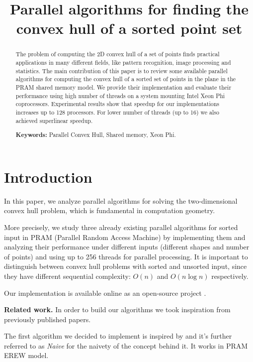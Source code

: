 \documentclass[letterpaper]{article}
\title{Parallel algorithms for finding the convex hull of a sorted point set}
\newcommand{\mypar}[1]{{\bf #1.}}
\theoremstyle{definition}
\begin{document}
%
\maketitle
%

\begin{abstract}
The problem of computing the 2D convex hull of a set of points finds practical applications in many different fields, like pattern recognition, image processing and statistics.
The main contribution of this paper is to review some available parallel algorithms for computing the convex hull of a sorted set of points in the plane in the PRAM shared memory model.
We provide their implementation and evaluate their performance using high number of threads on a system mounting Intel Xeon Phi coprocessors.
Experimental results show that speedup for our implementations increases up to 128 processors.
For lower number of threads (up to 16) we also achieved superlinear speedup.

\textbf{Keywords:} Parallel Convex Hull, Shared memory, Xeon Phi.

\end{abstract}

\section{Introduction}\label{sec:intro}

In this paper, we analyze parallel algorithms for solving the two-dimensional convex hull problem, which is fundamental in computation geometry.

More precisely, we study three already existing parallel algorithms for sorted input in PRAM (Parallel Random Access Machine) by implementing them and analyzing their performance under different inputs (different shapes and number of points) and using up to 256 threads for parallel processing.
It is important to distinguish between convex hull problems with sorted and unsorted input, since they have different sequential complexity: $O(n)$ and $O(n\log n)$ respectively.

Our implementation is available online as an open-source project \cite{GitHub}.

\mypar{Related work}
In order to build our algorithms we took inspiration from previously published papers.

The first algorithm we decided to implement is inspired by \cite{NaiveParallel} and it's further referred to as \textit{Naive} for the naivety of the concept behind it.
It works in PRAM EREW model.
\end{document}
